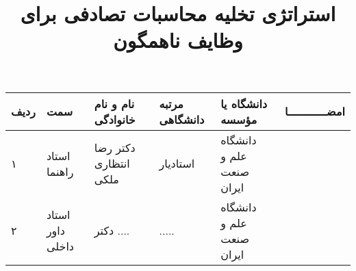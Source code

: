 \subject{مهندسی کامپیوتر}
\title{استراتژی تخلیه محاسبات تصادفی برای وظایف ناهمگون}


\firstPage
\besmPage
\davaranPage

\begin{center}
\begin{tabular}{| p{8mm} | p{18mm} | p{} |p{14mm}|p{}|c|}
\hline
ردیف	& سمت & نام و نام خانوادگی & مرتبه \newline دانشگاهی &	دانشگاه یا مؤسسه & امضــــــــــــا\\
\hline
۱  & استاد راهنما & دکتر \newline رضا انتظاری ملکی 
& استادیار & دانشگاه \newline علم و صنعت ایران &  \\
\hline
۲ & استاد داور \newline داخلی	 & دکتر \newline ....  & ..... & 
دانشگاه  \newline علم ‌و صنعت ایران & \\
\hline

\end{tabular}
\end{center}

